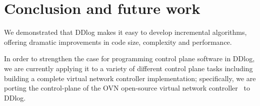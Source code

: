 \section{Conclusion and future work}\label{sec-conclusions}

We demonstrated that DDlog makes it easy to develop incremental algorithms, offering dramatic
improvements in code size, complexity and performance.

In order to strengthen the case for programming control plane software
in DDlog, we are currently applying it to a variety of different
control plane tasks including building a complete virtual network
controller implementation; specifically, we are porting the
control-plane of the OVN open-source virtual network
controller~\cite{ovn} to DDlog.
